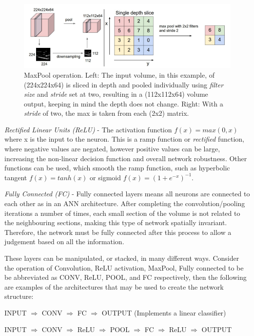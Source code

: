 \documentclass[fleqn,twoside,12pt]{report}
\begin{document}
\begin{figure}[h]
	\centering
	\includegraphics[width=\textwidth]{maxpool.png}
	\caption{MaxPool operation. Left: The input volume, in this example, of (224x224x64) is sliced in depth and pooled individually using \textit{filter size} and \textit{stride} set at two, resulting in a (112x112x64) volume output, keeping in mind the depth does not change. Right: With a \textit{stride} of two, the max is taken from each (2x2) matrix.}
	\label{fig:maxpool}
\end{figure}

\textit{Rectified Linear Units (ReLU)} - The activation function $f(x) = max(0, x)$ where x is the input to the neuron. This is a ramp function or \textit{rectified} function, where negative values are negated, however positive values can be large, increasing the non-linear decision function and overall network robustness. Other functions can be used, which smooth the ramp function, such as hyperbolic tangent $f(x) = tanh(x)$ or sigmoid $f(x) = (1+e^{-x})^{-1}$.

\textit{Fully Connected (FC)} - Fully connected layers means all neurons are connected to each other as in an ANN architecture. After completing the  convolution/pooling iterations a number of times, each small section of the volume is not related to the neighbouring sections, making this type of network spatially invariant. Therefore, the network must be fully connected after this process to allow a judgement based on all the information.

These layers can be manipulated, or stacked, in many different ways. Consider the operation of Convolution, ReLU activation, MaxPool, Fully connected to be be abbreviated as CONV, ReLU, POOL, and FC respectively, then the following are examples of the architectures that may be used to create the network structure:


INPUT $\Rightarrow$ CONV $\Rightarrow$ FC $\Rightarrow$ OUTPUT (Implements a linear classifier)

INPUT $\Rightarrow$ CONV $\Rightarrow$ ReLU $\Rightarrow$ POOL $\Rightarrow$ FC $\Rightarrow$ ReLU $\Rightarrow$ OUTPUT
\end{document}
